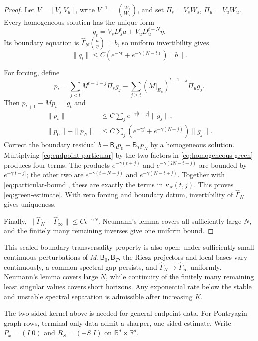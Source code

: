 \documentclass[twocolumn,nameyear,amsthm]{autart}
\newcommand{\R}{\mathbb R}
\newcommand{\Bzero}{\mathsf B_0}
\newcommand{\BT}{\mathsf B_T}
\numberwithin{equation}{section}
\begin{document}
\begin{proof}
Let $V=[V_s\ V_u]$, write $V^{-1}=\binom{W_s}{W_u}$, and set
$\Pi_s=V_sW_s$, $\Pi_u=V_uW_u$.  Every homogeneous solution has the unique
form
\[
 q_t=V_sD_s^ta+V_uD_u^{t-N}\eta .
\]
Its boundary equation is
$\widehat\Gamma_N\binom{a}{\eta}=b$, so uniform invertibility gives
\begin{equation}\label{eq:homogeneous-green}
 \|q_t\|\le C(e^{-\gamma t}+e^{-\gamma(N-t)})\|b\|.
\end{equation}

For forcing, define
\[
 p_t=\sum_{j<t}M^{t-1-j}\Pi_sg_j
      -\sum_{j\ge t}(M|_{E_u})^{t-1-j}\Pi_ug_j .
\]
Then $p_{t+1}-Mp_t=g_t$ and
\begin{align}
 \|p_t\|&\le C\sum_j e^{-\gamma|t-j|}\|g_j\|,\label{eq:particular-bound}\\
 \|p_0\|+\|p_N\|&\le C\sum_j
 (e^{-\gamma j}+e^{-\gamma(N-j)})\|g_j\|.\label{eq:endpoint-particular}
\end{align}
Correct the boundary residual
$b-\Bzero p_0-\BT p_N$ by a homogeneous solution.  Multiplying
\eqref{eq:endpoint-particular} by the two factors in
\eqref{eq:homogeneous-green} produces four terms.  The products
$e^{-\gamma(t+j)}$ and $e^{-\gamma(2N-t-j)}$ are bounded by
$e^{-\gamma|t-j|}$; the other two are
$e^{-\gamma(t+N-j)}$ and $e^{-\gamma(N-t+j)}$.  Together with
\eqref{eq:particular-bound}, these are exactly the terms in
$\kappa_N(t,j)$.  This proves \eqref{eq:green-estimate}.  With zero forcing
and boundary datum, invertibility of $\widehat\Gamma_N$ gives uniqueness.

Finally,
$\|\widehat\Gamma_N-\widehat\Gamma_\infty\|\le Ce^{-\gamma N}$.
Neumann's lemma covers all sufficiently large $N$, and the finitely many
remaining inverses give one uniform bound.
\end{proof}

This scaled boundary transversality property is also open: under sufficiently
small continuous perturbations of $M,\Bzero,\BT$, the
Riesz projectors and local bases vary continuously, a common spectral gap
persists, and $\widehat\Gamma_N\to\widehat\Gamma_\infty$ uniformly.  Neumann's
lemma covers large $N$, while continuity of the finitely many remaining least
singular values covers short horizons.  Any exponential rate below the stable
and unstable spectral separation is admissible after increasing $K$.

The two-sided kernel above is needed for general endpoint data.  For Pontryagin
graph rows, terminal-only data admit a sharper, one-sided estimate.
Write $P_x=(I\;0)$ and $R_S=(-S\;I)$ on $\R^d\times\R^d$.
\end{document}
